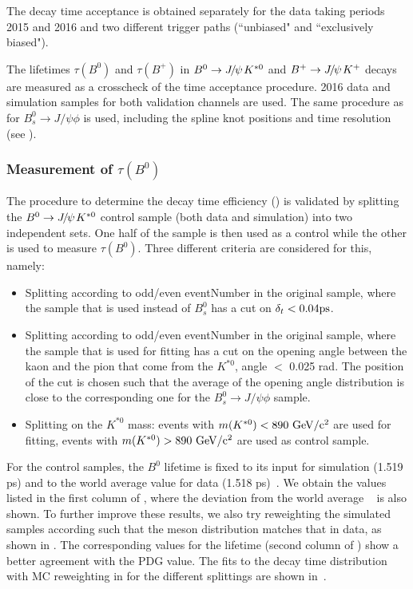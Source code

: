 The decay time acceptance is obtained separately for the data taking periods 2015 and 2016 and two different trigger paths (``unbiased" and ``exclusively biased"). 

The lifetimes $\tau(B^{0})$ and $\tau(B^{+})$ in $B^{0}\to {\ensuremath{{J\mskip -3mu/\mskip -2mu\psi\mskip 2mu}}} K^{*0}$ and $B^{+}\to {\ensuremath{{J\mskip -3mu/\mskip -2mu\psi\mskip 2mu}}} K^{+}$ decays are measured as a crosscheck of the time acceptance procedure. 2016 data and simulation samples for both validation channels are used.  The same procedure as for $B^{0}_{s}\rightarrow J/\psi \phi$ is used, including the spline knot positions and time resolution (see ).

\subsubsection{Measurement of $\tau(B^{0})$} 

The procedure to determine the decay time efficiency () is validated by splitting the 
$B^{0}\to{\ensuremath{{J\mskip -3mu/\mskip -2mu\psi\mskip 2mu}}} K^{*0}$ control sample (both data and simulation) into two independent sets. One half of the sample is then used as a control while the other is used to measure $\tau(B^0)$.
Three different criteria are considered for this, namely:
\begin{itemize} 
    \item Splitting according to odd/even eventNumber in the
        original sample, where the sample that is used instead of $B_s^0$ has a
    cut on $\delta_t < 0.04\rm ps$.  
\item Splitting according to odd/even
        eventNumber in the original sample, where the sample that is used for
        fitting has a cut on the opening angle between the kaon and the pion
        that come from the $K^{*0}$, angle $<$ 0.025 rad. The position of the cut is
        chosen such that the average of the opening angle distribution is close
        to the corresponding one for the $B^{0}_{s}\to J/\psi \phi$ sample.
    \item Splitting on the $K^{*0}$ mass: events with $m(K^{*0}) < 890\ \rm
        GeV/{c^2}$ are used for fitting, events with $m(K^{*0}) > 890 \ \rm
        GeV/{c^2}$ are used as control sample.  
        \end{itemize}

For the control samples, the $B^{0}$ lifetime is fixed to its input for
simulation (1.519 ps) and to the
world average value for data (1.518 ps)~\cite{HFLAV2017}. We obtain the values
listed in the first column of , where the deviation from the
world average ~\cite{HFLAV2017} is also shown. To
further improve these results, we also try reweighting the simulated samples according
such that the \Bd meson \pt distribution matches that in data,
as shown in .
The corresponding values for the lifetime (second column of )
show a better agreement with the PDG value. The fits to the decay time
distribution with MC reweighting in \pt for the different splittings are
shown in~.


